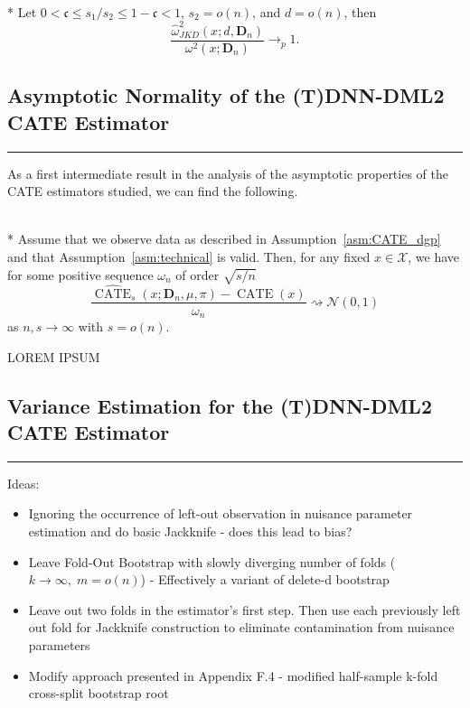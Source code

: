 \begin{boxD}
	\begin{thm}\label{thm:JKD_Cons}\mbox{}\\*
		Let $0 < \mathfrak{c} \leq s_1/s_2 \leq 1 - \mathfrak{c} < 1$, $s_2 = o(n)$, and $d = o(n)$, then
		\begin{equation}
			\frac{\hat{\omega}_{JKD}^2\left(x; d, \mathbf{D}_n\right)}{\omega^{2}\left(x; \mathbf{D}_n\right)} \longrightarrow_{p} 1.
		\end{equation}
	\end{thm}
\end{boxD}

\newpage
\subsection{Asymptotic Normality of the (T)DNN-DML2 CATE Estimator}\label{CATE_AsympNorm}
\hrule

As a first intermediate result in the analysis of the asymptotic properties of the CATE estimators studied, we can find the following.
\begin{boxD}
	\begin{thm}\label{thm:DNNDML2_anorm_0}\mbox{}\\*
		Assume that we observe data as described in Assumption~\ref{asm:CATE_dgp} and that Assumption~\ref{asm:technical} is valid.
		Then, for any fixed $x \in \mathcal{X}$, we have for some positive sequence $\omega_n$ of order $\sqrt{s/n}$
		\begin{equation}
			\frac{\hat{\operatorname{CATE}}_{s}(x; \mathbf{D}_n, \mu, \pi) - \operatorname{CATE}(x)}{\omega_n}
			\rightsquigarrow \mathcal{N}\left(0,1\right)
		\end{equation}
		as $n,s \rightarrow \infty$ with $s = o(n)$.
	\end{thm}
\end{boxD}

{\color{red} LOREM IPSUM}

\subsection{Variance Estimation for the (T)DNN-DML2 CATE Estimator}\label{CATE_Var_Ests}
\hrule

{\color{red}
Ideas:
\begin{itemize}
	\item Ignoring the occurrence of left-out observation in nuisance parameter estimation and do basic Jackknife - does this lead to bias?
	\item Leave Fold-Out Bootstrap with slowly diverging number of folds ($k \rightarrow \infty, \;m = o(n)$) - Effectively a variant of delete-d bootstrap
	\item Leave out two folds in the estimator's first step. 
	Then use each previously left out fold for Jackknife construction to eliminate contamination from nuisance parameters
	\item Modify approach presented in \citet{ritzwoller_uniform_2024} Appendix F.4 - modified half-sample k-fold cross-split bootstrap root
\end{itemize}
}


